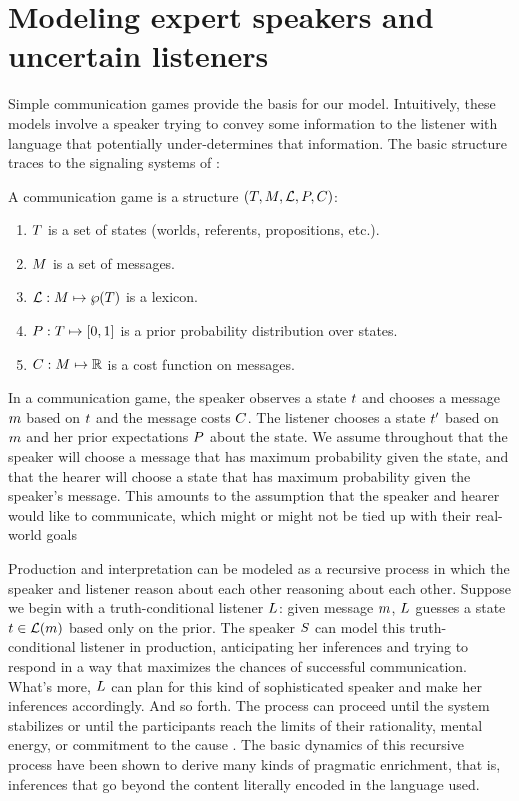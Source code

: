 \section{Modeling expert speakers and uncertain listeners}\label{sec:model}

Simple communication games provide the basis for our
model. Intuitively, these models involve a speaker trying to convey
some information to the listener with language that potentially
under-determines that information.  The basic structure traces to the
signaling systems of \cite{Lewis69}:

\begin{definition}\label{def:struc} 
  A communication game is a structure $(T, M, \mathcal{L}, P, C)$:
  \begin{enumerate}\setlength{\itemsep}{0pt}
  \item $T$ is a set of states (worlds, referents, propositions, etc.).
  \item $M$ is a set of messages.
  \item $\mathcal{L}: M \mapsto \wp(T)$ is a lexicon.
  \item $P : T \mapsto [0,1]$ is a prior probability
    distribution over states.   
  \item $C : M \mapsto \mathbb{R}$ is a cost function on messages.
  \end{enumerate}
\end{definition}

In a communication game, the speaker observes a state $t$ and
chooses a message $m$ based on $t$ and the message costs
$C$. The listener chooses a state $t'$ based on $m$ and
her prior expectations $P$ about the state.  We assume throughout
that the speaker will choose a message that has maximum probability
given the state, and that the hearer will choose a state that has
maximum probability given the speaker's message.  This amounts to the
assumption that the speaker and hearer would like to communicate,
which might or might not be tied up with their real-world goals
\cite{Franke-etal:2009,Asher:Lascarides:2013}

Production and interpretation can be modeled as a recursive process in
which the speaker and listener reason about each other reasoning about
each other.  Suppose we begin with a truth-conditional listener
$L$: given message $m$, $L$ guesses a
state $t \in \mathcal{L}(m)$ based only on the prior.  The speaker
$S$ can model this truth-conditional listener in
production, anticipating her inferences and trying to respond in a way
that maximizes the chances of successful communication.  What's more,
$L$ can plan for this kind of sophisticated speaker and
make her inferences accordingly.  And so forth. The process can
proceed until the system stabilizes or until the participants reach
the limits of their rationality, mental energy, or commitment to the
cause
\cite{CamererHo:2004,Franke:2008,Franke09DISS,Jaeger:2007,Jaeger:2011}.
The basic dynamics of this recursive process have been shown to derive
many kinds of pragmatic enrichment, that is, inferences that go beyond
the content literally encoded in the language used.


